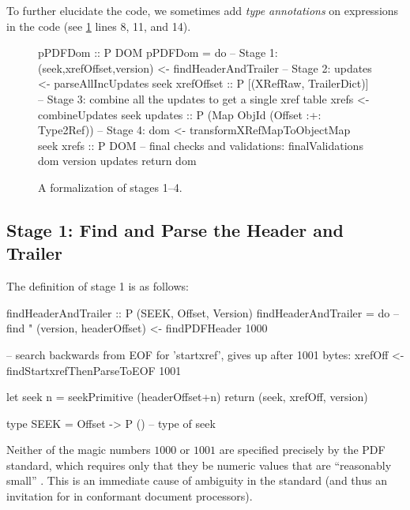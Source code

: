 To further elucidate the code, we sometimes add \emph{type
  annotations} on expressions in the code (see \cref{fig:spec} lines
8, 11, and 14).

\begin{figure}[t]
\centering
\lstset{numbers=right}
\begin{code}
pPDFDom :: P DOM
pPDFDom =
    do
    -- Stage 1:
    (seek,xrefOffset,version) <- findHeaderAndTrailer
    -- Stage 2:
    updates <- parseAllIncUpdates seek xrefOffset
               :: P [(XRefRaw, TrailerDict)]
    -- Stage 3: combine all the updates to get a single xref table
    xrefs <- combineUpdates seek updates
             :: P (Map ObjId (Offset :+: Type2Ref))
    -- Stage 4:
    dom <- transformXRefMapToObjectMap seek xrefs
           :: P DOM
    -- final checks and validations:
    finalValidations dom version updates
    return dom
\end{code}
\caption{A formalization of stages 1--4.}
\label{fig:spec}
\end{figure}


\subsection{Stage 1: Find and Parse the Header and Trailer}
\label{sec:stage-1}

The definition of stage 1 is as follows:
\begin{code}
findHeaderAndTrailer :: P (SEEK, Offset, Version)
findHeaderAndTrailer =
    do
    -- find "%
    (version, headerOffset) <- findPDFHeader 1000

    -- search backwards from EOF for 'startxref', gives up after 1001 bytes:
    xrefOff <- findStartxrefThenParseToEOF 1001
    
    let seek n = seekPrimitive (headerOffset+n)
    return (seek, xrefOff, version)
    
type SEEK = Offset -> P () -- type of seek
\end{code}

Neither of the magic numbers $1000$ or $1001$ are specified precisely
by the PDF standard, which requires only that they be numeric values
that are ``reasonably small'' .
%
This is an immediate cause of ambiguity in the standard (and thus an
invitation for \pd{} in conformant document processors).


